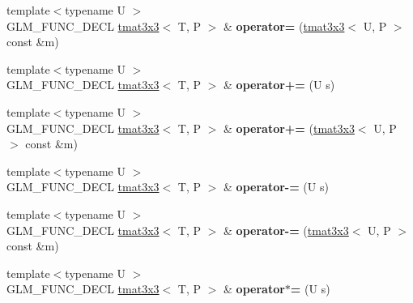 \begin{DoxyCompactItemize}
\item 
\hypertarget{structglm_1_1tmat3x3_a4cfacf82df6bb99bca19076bfd27c3f9}{{\footnotesize template$<$typename U $>$ }\\G\-L\-M\-\_\-\-F\-U\-N\-C\-\_\-\-D\-E\-C\-L \hyperlink{structglm_1_1tmat3x3}{tmat3x3}$<$ T, P $>$ \& {\bfseries operator=} (\hyperlink{structglm_1_1tmat3x3}{tmat3x3}$<$ U, P $>$ const \&m)}\label{structglm_1_1tmat3x3_a4cfacf82df6bb99bca19076bfd27c3f9}

\item 
\hypertarget{structglm_1_1tmat3x3_a5bf05bc4653ffe3fccf1a04c04892f64}{{\footnotesize template$<$typename U $>$ }\\G\-L\-M\-\_\-\-F\-U\-N\-C\-\_\-\-D\-E\-C\-L \hyperlink{structglm_1_1tmat3x3}{tmat3x3}$<$ T, P $>$ \& {\bfseries operator+=} (U s)}\label{structglm_1_1tmat3x3_a5bf05bc4653ffe3fccf1a04c04892f64}

\item 
\hypertarget{structglm_1_1tmat3x3_af0582e969c35858f4d11afc5327c3d4b}{{\footnotesize template$<$typename U $>$ }\\G\-L\-M\-\_\-\-F\-U\-N\-C\-\_\-\-D\-E\-C\-L \hyperlink{structglm_1_1tmat3x3}{tmat3x3}$<$ T, P $>$ \& {\bfseries operator+=} (\hyperlink{structglm_1_1tmat3x3}{tmat3x3}$<$ U, P $>$ const \&m)}\label{structglm_1_1tmat3x3_af0582e969c35858f4d11afc5327c3d4b}

\item 
\hypertarget{structglm_1_1tmat3x3_a50e65bdba7c569ff3fb987d0e9dedaa1}{{\footnotesize template$<$typename U $>$ }\\G\-L\-M\-\_\-\-F\-U\-N\-C\-\_\-\-D\-E\-C\-L \hyperlink{structglm_1_1tmat3x3}{tmat3x3}$<$ T, P $>$ \& {\bfseries operator-\/=} (U s)}\label{structglm_1_1tmat3x3_a50e65bdba7c569ff3fb987d0e9dedaa1}

\item 
\hypertarget{structglm_1_1tmat3x3_aab14e291cf845dc23bc569524ee341c8}{{\footnotesize template$<$typename U $>$ }\\G\-L\-M\-\_\-\-F\-U\-N\-C\-\_\-\-D\-E\-C\-L \hyperlink{structglm_1_1tmat3x3}{tmat3x3}$<$ T, P $>$ \& {\bfseries operator-\/=} (\hyperlink{structglm_1_1tmat3x3}{tmat3x3}$<$ U, P $>$ const \&m)}\label{structglm_1_1tmat3x3_aab14e291cf845dc23bc569524ee341c8}

\item 
\hypertarget{structglm_1_1tmat3x3_a42fa6d5be3660d80e31fe192c15df2c4}{{\footnotesize template$<$typename U $>$ }\\G\-L\-M\-\_\-\-F\-U\-N\-C\-\_\-\-D\-E\-C\-L \hyperlink{structglm_1_1tmat3x3}{tmat3x3}$<$ T, P $>$ \& {\bfseries operator$\ast$=} (U s)}\label{structglm_1_1tmat3x3_a42fa6d5be3660d80e31fe192c15df2c4}


\end{DoxyCompactItemize}
